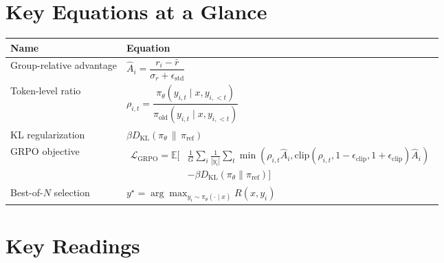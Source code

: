 \section*{Key Equations at a Glance}

\begin{center}
\small
\begin{tabularx}{\textwidth}{@{}lX@{}}
\toprule
\textbf{Name} & \textbf{Equation} \\
\midrule
Group-relative advantage & $\hat{A}_i = \dfrac{r_i - \bar{r}}{\sigma_r + \epsilon_{\text{std}}}$ \\[8pt]
Token-level ratio & $\rho_{i,t} = \dfrac{\pi_\theta(y_{i,t}\mid x,y_{i,<t})}{\pi_{\text{old}}(y_{i,t}\mid x,y_{i,<t})}$ \\[8pt]
KL regularization & $\beta D_{\text{KL}}(\pi_\theta \,\|\, \pi_{\text{ref}})$ \\[8pt]
GRPO objective &
$\begin{aligned}
\mathcal{L}_{\text{GRPO}}=\mathbb{E}\!\Bigg[
&\frac{1}{G}\sum_i \frac{1}{|y_i|}\sum_t
\min\!\left(\rho_{i,t}\hat{A}_i,\text{clip}(\rho_{i,t},1-\epsilon_{\text{clip}},1+\epsilon_{\text{clip}})\hat{A}_i\right)\\
&-\beta D_{\text{KL}}(\pi_\theta\|\pi_{\text{ref}})
\Bigg]
\end{aligned}$ \\[8pt]
Best-of-$N$ selection & $y^\star = \arg\max_{y_i \sim \pi_\theta(\cdot\mid x)} R(x,y_i)$ \\
\bottomrule
\end{tabularx}
\normalsize
\end{center}


\section*{Key Readings}


